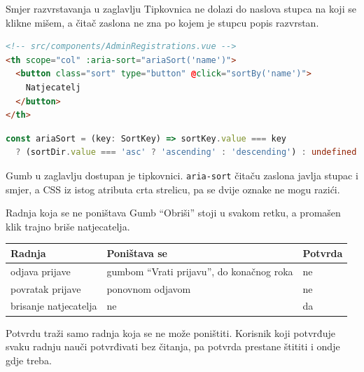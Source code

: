 \begin{frame}[fragile]{Smjer razvrstavanja u zaglavlju}
Tipkovnica ne dolazi do naslova stupca na koji se klikne mišem, a čitač zaslona ne zna po kojem je stupcu popis razvrstan.

\begin{lstlisting}[language=html]
<!-- src/components/AdminRegistrations.vue -->
<th scope="col" :aria-sort="ariaSort('name')">
  <button class="sort" type="button" @click="sortBy('name')">
    Natjecatelj
  </button>
</th>
\end{lstlisting}

\begin{lstlisting}[language=typescript]
const ariaSort = (key: SortKey) => sortKey.value === key
  ? (sortDir.value === 'asc' ? 'ascending' : 'descending') : undefined
\end{lstlisting}

\vspace{0.1em}
Gumb u zaglavlju dostupan je tipkovnici. \texttt{aria-sort} čitaču zaslona javlja stupac i smjer, a CSS iz istog atributa crta strelicu, pa se dvije oznake ne mogu razići.
\end{frame}

\begin{frame}{Radnja koja se ne poništava}
Gumb \enquote{Obriši} stoji u svakom retku, a promašen klik trajno briše natjecatelja.

\vspace{0.5em}
\begin{center}
{\small
\setlength{\tabcolsep}{6pt}
\renewcommand{\arraystretch}{1.35}
\begin{tabular}{@{}L{3.2cm}L{7.0cm}L{1.6cm}@{}}
  \toprule
  \textbf{Radnja} & \textbf{Poništava se} & \textbf{Potvrda} \\
  \midrule
  odjava prijave & gumbom \enquote{Vrati prijavu}, do konačnog roka & ne \\
  povratak prijave & ponovnom odjavom & ne \\
  brisanje natjecatelja & ne & da \\
  \bottomrule
\end{tabular}
}
\end{center}

\vspace{0.4em}
\begin{konvencija}
Potvrdu traži samo radnja koja se ne može poništiti. Korisnik koji potvrđuje svaku radnju nauči potvrđivati bez čitanja, pa potvrda prestane štititi i ondje gdje treba.
\end{konvencija}
\end{frame}

